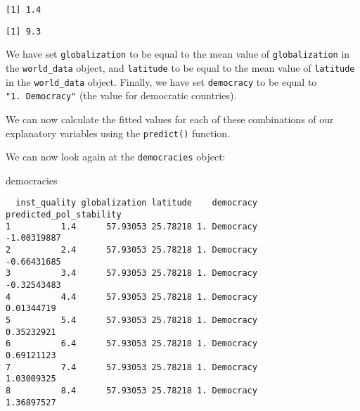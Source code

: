\documentclass[]{article}
\newenvironment{Shaded}{\begin{snugshade}}{\end{snugshade}}
\newcommand{\DataTypeTok}[1]{\textcolor[rgb]{0.13,0.29,0.53}{#1}}
\newcommand{\KeywordTok}[1]{\textcolor[rgb]{0.13,0.29,0.53}{\textbf{#1}}}
\newcommand{\NormalTok}[1]{#1}
\newcommand{\OperatorTok}[1]{\textcolor[rgb]{0.81,0.36,0.00}{\textbf{#1}}}
\newcommand{\StringTok}[1]{\textcolor[rgb]{0.31,0.60,0.02}{#1}}
\begin{document}
\begin{verbatim}
[1] 1.4
\end{verbatim}

\begin{Shaded}
\end{Shaded}

\begin{verbatim}
[1] 9.3
\end{verbatim}

We have set \texttt{globalization} to be equal to the mean value of \texttt{globalization} in the \texttt{world\_data} object, and \texttt{latitude} to be equal to the mean value of \texttt{latitude} in the \texttt{world\_data} object. Finally, we have set \texttt{democracy} to be equal to \texttt{"1.\ Democracy"} (the value for democratic countries).

We can now calculate the fitted values for each of these combinations of our explanatory variables using the \texttt{predict()} function.

\begin{Shaded}
\end{Shaded}

We can now look again at the \texttt{democracies} object:

\begin{Shaded}
\begin{Highlighting}[]
\NormalTok{democracies}
\end{Highlighting}
\end{Shaded}

\begin{verbatim}
  inst_quality globalization latitude    democracy predicted_pol_stability
1          1.4      57.93053 25.78218 1. Democracy             -1.00319887
2          2.4      57.93053 25.78218 1. Democracy             -0.66431685
3          3.4      57.93053 25.78218 1. Democracy             -0.32543483
4          4.4      57.93053 25.78218 1. Democracy              0.01344719
5          5.4      57.93053 25.78218 1. Democracy              0.35232921
6          6.4      57.93053 25.78218 1. Democracy              0.69121123
7          7.4      57.93053 25.78218 1. Democracy              1.03009325
8          8.4      57.93053 25.78218 1. Democracy              1.36897527
\end{verbatim}
\end{document}
